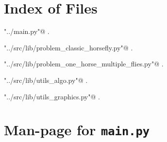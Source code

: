 \documentclass[11.5pt]{report}
\begin{document}
\begin{appendices}
\chapter{Index of Files}

{\small\begin{list}{}{\setlength{\itemsep}{-\parsep}\setlength{\itemindent}{-\leftmargin}}
\item \verb@"../main.py"@ {\footnotesize {\NWtxtDefBy} .}
\item \verb@"../src/lib/problem_classic_horsefly.py"@ {\footnotesize {\NWtxtDefBy} .}
\item \verb@"../src/lib/problem_one_horse_multiple_flies.py"@ {\footnotesize {\NWtxtDefBy} .}
\item \verb@"../src/lib/utils_algo.py"@ {\footnotesize {\NWtxtDefBy} .
}
\item \verb@"../src/lib/utils_graphics.py"@ {\footnotesize {\NWtxtDefBy} .
}
\end{list}}
\chapter{Man-page for \texttt{main.py}}


\end{appendices}
\end{document}
